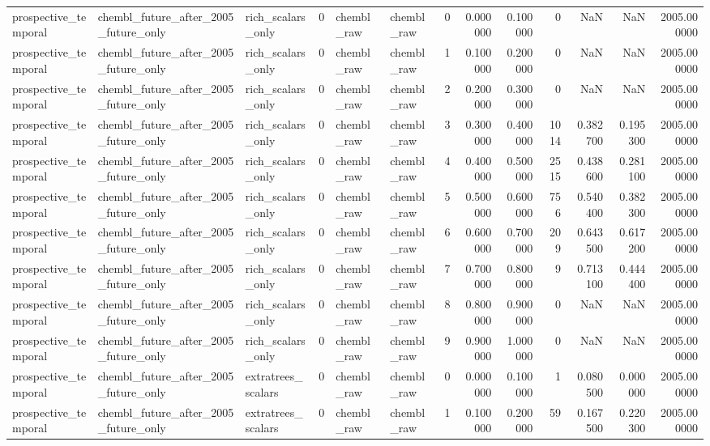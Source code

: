 \begin{longtable}{lllrllrrrrrrr}
prospective\_temporal & chembl\_future\_after\_2005\_future\_only & rich\_scalars\_only & 0 & chembl\_raw & chembl\_raw & 0 & 0.000000 & 0.100000 & 0 & NaN & NaN & 2005.000000 \\
prospective\_temporal & chembl\_future\_after\_2005\_future\_only & rich\_scalars\_only & 0 & chembl\_raw & chembl\_raw & 1 & 0.100000 & 0.200000 & 0 & NaN & NaN & 2005.000000 \\
prospective\_temporal & chembl\_future\_after\_2005\_future\_only & rich\_scalars\_only & 0 & chembl\_raw & chembl\_raw & 2 & 0.200000 & 0.300000 & 0 & NaN & NaN & 2005.000000 \\
prospective\_temporal & chembl\_future\_after\_2005\_future\_only & rich\_scalars\_only & 0 & chembl\_raw & chembl\_raw & 3 & 0.300000 & 0.400000 & 1014 & 0.382700 & 0.195300 & 2005.000000 \\
prospective\_temporal & chembl\_future\_after\_2005\_future\_only & rich\_scalars\_only & 0 & chembl\_raw & chembl\_raw & 4 & 0.400000 & 0.500000 & 2515 & 0.438600 & 0.281100 & 2005.000000 \\
prospective\_temporal & chembl\_future\_after\_2005\_future\_only & rich\_scalars\_only & 0 & chembl\_raw & chembl\_raw & 5 & 0.500000 & 0.600000 & 756 & 0.540400 & 0.382300 & 2005.000000 \\
prospective\_temporal & chembl\_future\_after\_2005\_future\_only & rich\_scalars\_only & 0 & chembl\_raw & chembl\_raw & 6 & 0.600000 & 0.700000 & 209 & 0.643500 & 0.617200 & 2005.000000 \\
prospective\_temporal & chembl\_future\_after\_2005\_future\_only & rich\_scalars\_only & 0 & chembl\_raw & chembl\_raw & 7 & 0.700000 & 0.800000 & 9 & 0.713100 & 0.444400 & 2005.000000 \\
prospective\_temporal & chembl\_future\_after\_2005\_future\_only & rich\_scalars\_only & 0 & chembl\_raw & chembl\_raw & 8 & 0.800000 & 0.900000 & 0 & NaN & NaN & 2005.000000 \\
prospective\_temporal & chembl\_future\_after\_2005\_future\_only & rich\_scalars\_only & 0 & chembl\_raw & chembl\_raw & 9 & 0.900000 & 1.000000 & 0 & NaN & NaN & 2005.000000 \\
prospective\_temporal & chembl\_future\_after\_2005\_future\_only & extratrees\_scalars & 0 & chembl\_raw & chembl\_raw & 0 & 0.000000 & 0.100000 & 1 & 0.080500 & 0.000000 & 2005.000000 \\
prospective\_temporal & chembl\_future\_after\_2005\_future\_only & extratrees\_scalars & 0 & chembl\_raw & chembl\_raw & 1 & 0.100000 & 0.200000 & 59 & 0.167500 & 0.220300 & 2005.000000 \\

\end{longtable}
